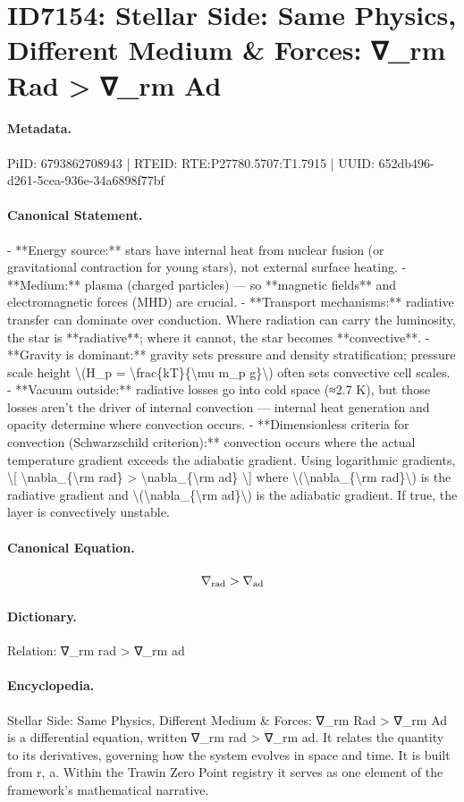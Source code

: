 \section*{ID7154: Stellar Side: Same Physics, Different Medium \& Forces: ∇\_rm Rad > ∇\_rm Ad}
\paragraph{Metadata.}
PiID: 6793862708943 | RTEID: RTE:P27780.5707:T1.7915 | UUID: 652db496-d261-5cea-936e-34a6898f77bf

\paragraph{Canonical Statement.}
- **Energy source:** stars have internal heat from nuclear fusion (or gravitational contraction for young stars), not external surface heating. - **Medium:** plasma (charged particles) — so **magnetic fields** and electromagnetic forces (MHD) are crucial. - **Transport mechanisms:** radiative transfer can dominate over conduction. Where radiation can carry the luminosity, the star is **radiative**; where it cannot, the star becomes **convective**. - **Gravity is dominant:** gravity sets pressure and density stratification; pressure scale height \textbackslash{}(H\_p = \textbackslash{}frac\{kT\}\{\textbackslash{}mu m\_p g\}\textbackslash{}) often sets convective cell scales. - **Vacuum outside:** radiative losses go into cold space (≈2.7 K), but those losses aren’t the driver of internal convection — internal heat generation and opacity determine where convection occurs. - **Dimensionless criteria for convection (Schwarzschild criterion):** convection occurs where the actual temperature gradient exceeds the adiabatic gradient. Using logarithmic gradients, \textbackslash{}[ \textbackslash{}nabla\_\{\textbackslash{}rm rad\} > \textbackslash{}nabla\_\{\textbackslash{}rm ad\} \textbackslash{}] where \textbackslash{}(\textbackslash{}nabla\_\{\textbackslash{}rm rad\}\textbackslash{}) is the radiative gradient and \textbackslash{}(\textbackslash{}nabla\_\{\textbackslash{}rm ad\}\textbackslash{}) is the adiabatic gradient. If true, the layer is convectively unstable.

\paragraph{Canonical Equation.}
\[
\nabla_{\rm rad} > \nabla_{\rm ad}
\]

\paragraph{Dictionary.}
Relation: ∇\_rm rad > ∇\_rm ad

\paragraph{Encyclopedia.}
Stellar Side: Same Physics, Different Medium \& Forces: ∇\_rm Rad > ∇\_rm Ad is a differential equation, written ∇\_rm rad > ∇\_rm ad. It relates the quantity to its derivatives, governing how the system evolves in space and time. It is built from r, a. Within the Trawin Zero Point registry it serves as one element of the framework's mathematical narrative.
